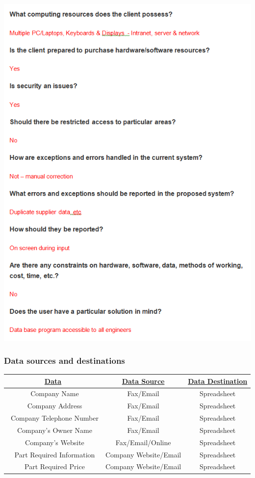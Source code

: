 \begin{center}
\includegraphics{InterviewPart3.jpg}
\end{center}



\subsubsection{Data sources and destinations}

\begin{center}
\begin{tabular}{ |c|c|c| } 
\hline
\bf\underline{Data}& \bf\underline{Data Source} & \bf\underline{Data Destination}

\\
\hline
\ Company Name & Fax/Email & Spreadsheet\\
\hline
\ Company Address & Fax/Email & Spreadsheet\\ 
\hline
\ Company Telephone Number & Fax/Email & Spreadsheet\\
\hline
\ Company's Owner Name & Fax/Email & Spreadsheet\\
\hline
\ Company's Website & Fax/Email/Online & Spreadsheet\\
\hline
\ Part Required Information & Company Website/Email & Spreadsheet\\
\hline
\ Part Required Price & Company Website/Email & Spreadsheet\\
\hline
\end{tabular}
\end{center}
